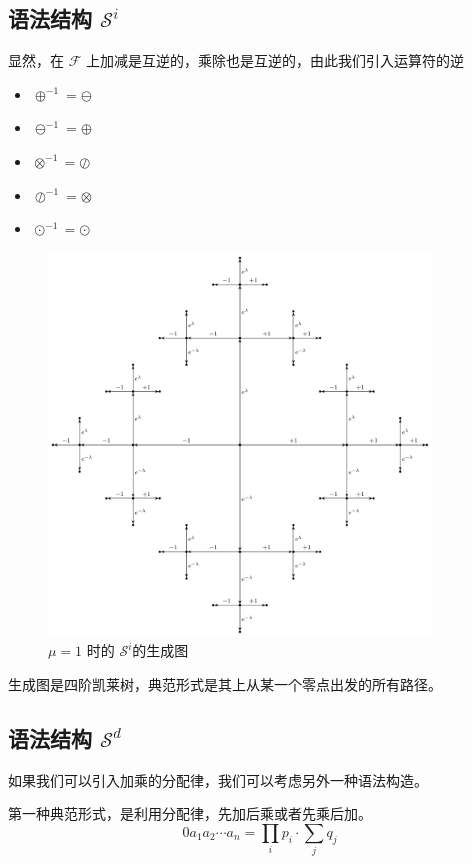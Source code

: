 \documentclass[a4paper,12pt]{article}
\numberwithin{definition}{section}
\numberwithin{lemma}{section}
\numberwithin{proposition}{section}
\numberwithin{theorem}{section}
\numberwithin{grammar}{section}
\numberwithin{program}{section}
\numberwithin{convention}{section}
\numberwithin{corollary}{section}
\begin{document}
\subsection{语法结构 $\mathcal{S}^i$}\label{subsec:syntactical}

显然，在 $\mathcal{F}$ 上加减是互逆的，乘除也是互逆的，由此我们引入运算符的逆
\begin{itemize}
    \item $\oplus^{-1} = \ominus$
    \item $\ominus^{-1} = \oplus$
    \item $\otimes^{-1} = \oslash$
    \item $\oslash^{-1} = \otimes$
    \item $\odot^{-1} = \odot$
\end{itemize}

\begin{figure}[ht]
\centering
\includegraphics[width=4in]{images/cayley_i}
\caption{$\mu=1$ 时的 $\mathcal{S}^i$的生成图}
\end{figure}

生成图是四阶凯莱树，典范形式是其上从某一个零点出发的所有路径。

\subsection{语法结构 $\mathcal{S}^d$}\label{subsec:syntactical}

如果我们可以引入加乘的分配律，我们可以考虑另外一种语法构造。

第一种典范形式，是利用分配律，先加后乘或者先乘后加。
$$
0 a_1 a_2 \cdots a_n = \prod_{i} p_i \cdot \sum_{j} q_j
$$
\end{document}
